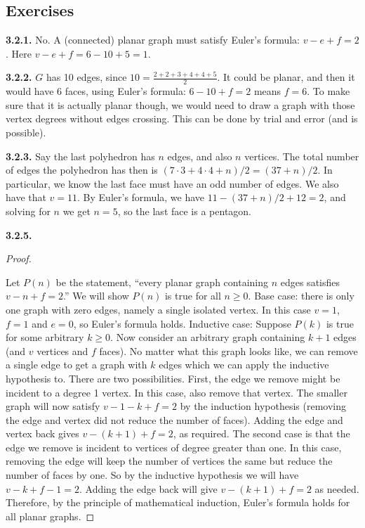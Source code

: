 \documentclass[10pt,]{book}
\theoremstyle{plain}
\theoremstyle{definition}
\theoremstyle{definition}
\theoremstyle{definition}
\theoremstyle{definition}
\numberwithin{equation}{chapter}
\begin{document}
\subsection*{ Exercises}
\noindent\textbf{3.2.1.} \hypertarget{p-1623}{}%
No. A (connected) planar graph must satisfy Euler's formula: \(v - e + f = 2\). Here \(v - e + f = 6 - 10 + 5 = 1\).%
\par\smallskip
\noindent\textbf{3.2.2.} \hypertarget{p-1625}{}%
\(G\) has 10 edges, since \(10 = \frac{2+2+3+4+4+5}{2}\). It could be planar, and then it would have 6 faces, using Euler's formula: \(6-10+f = 2\) means \(f = 6\).  To make sure that it is actually planar though, we would need to draw a graph with those vertex degrees without edges crossing.  This can be done by trial and error (and is possible).%
\par\smallskip
\noindent\textbf{3.2.3.} \hypertarget{p-1627}{}%
Say the last polyhedron has \(n\) edges, and also \(n\) vertices. The total number of edges the polyhedron has then is \((7 \cdot 3 + 4 \cdot 4 + n)/2 = (37 + n)/2\). In particular, we know the last face must have an odd number of edges. We also have that \(v = 11 \).  By Euler's formula, we have \(11 - (37+n)/2 + 12 = 2\), and solving for \(n\) we get \(n = 5\), so the last face is a pentagon.%
\par\smallskip
\noindent\textbf{3.2.5.} \begin{proof}\hypertarget{proof-41}{}
\hypertarget{p-1633}{}%
Let \(P(n)\) be the statement, ``every planar graph containing \(n\) edges satisfies \(v - n + f = 2\).'' We will show \(P(n)\) is true for all \(n \ge 0\). Base case: there is only one graph with zero edges, namely a single isolated vertex. In this case \(v = 1\), \(f = 1\) and \(e = 0\), so Euler's formula holds. Inductive case: Suppose \(P(k)\) is true for some arbitrary \(k \ge 0\). Now consider an arbitrary graph containing \(k+1\) edges (and \(v\) vertices and \(f\) faces). No matter what this graph looks like, we can remove a single edge to get a graph with \(k\) edges which we can apply the inductive hypothesis to. There are two possibilities. First, the edge we remove might be incident to a degree 1 vertex. In this case, also remove that vertex. The smaller graph will now satisfy \(v-1 - k + f = 2\) by the induction hypothesis (removing the edge and vertex did not reduce the number of faces). Adding the edge and vertex back gives \(v - (k+1) + f = 2\), as required. The second case is that the edge we remove is incident to vertices of degree greater than one. In this case, removing the edge will keep the number of vertices the same but reduce the number of faces by one. So by the inductive hypothesis we will have \(v - k + f-1 = 2\). Adding the edge back will give \(v - (k+1) + f = 2\) as needed. Therefore, by the principle of mathematical induction, Euler's formula holds for all planar graphs.%
\end{proof}
\end{document}
